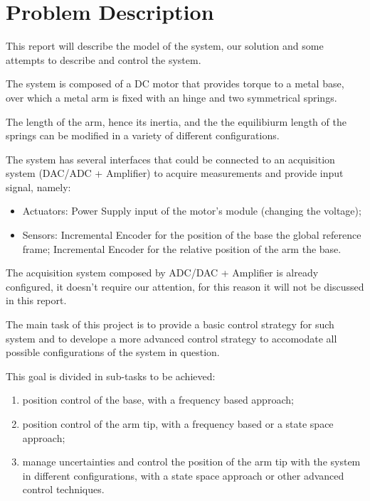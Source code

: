 \chapter{Problem Description}
\label{cha:problem_description}

    This report will describe the model of the system, our solution and some attempts to describe and control the system.

    The system is composed of a DC motor that provides torque to a metal base, over which a metal arm is fixed with an hinge and two symmetrical springs.

    The length of the arm, hence its inertia, and the the equilibiurm length of the springs can be modified in a variety of different configurations.

    The system has several interfaces that could be connected to an acquisition system (DAC/ADC + Amplifier) to acquire measurements and provide input signal, namely:
    \begin{itemize}
        \item Actuators:
            \subitem Power Supply input of the motor's module (changing the voltage);
        \item Sensors:
            \subitem Incremental Encoder for the position of the base \wrt the global reference frame;
            \subitem Incremental Encoder for the relative position of the arm \wrt the base.
    \end{itemize}
    The acquisition system composed by ADC/DAC + Amplifier is already configured, it doesn't require our attention, for this reason it will not be discussed in this report.

    The main task of this project is to provide a basic control strategy for such system and to develope a more advanced control strategy to accomodate all possible configurations of the system in question.
    
    This goal is divided in sub-tasks to be achieved:
    \begin{enumerate}
        \item position control of the base, with a frequency based approach;
        \item position control of the arm tip, with a frequency based or a state space approach;
        \item manage uncertainties and control the position of the arm tip with the system in different configurations, with a state space approach or other advanced control techniques.
    \end{enumerate}






